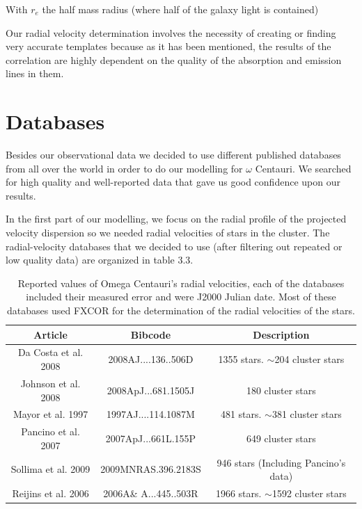 With $r_{e}$ the half mass radius (where half of the galaxy light is contained)

Our radial velocity determination involves the necessity of creating or finding very accurate templates because as it has been mentioned, the results of the correlation are highly dependent on the quality of the absorption and emission lines in them.   

\section{Databases}

Besides our observational data we decided to use different published databases from all over the world in order to do our modelling for $\omega$ Centauri. We searched for high quality and well-reported data that gave us good confidence upon our results.
 
In the first part of our modelling, we focus on the radial profile of the projected velocity dispersion so we needed radial velocities of stars in the cluster. The radial-velocity databases that we decided to use (after filtering out repeated or low quality data) are organized in table 3.3.

\begin{table}[H]
\begin{center}
\begin{tabular}{| c | c| c| }
    \hline
    \textbf{Article} & \textbf{Bibcode} & \textbf{Description} \\ \hline
     Da Costa et al. 2008 & 2008AJ....136..506D & 1355 stars. $\sim$204 cluster stars \\ \hline
     Johnson et al. 2008 & 2008ApJ...681.1505J & 180 cluster stars \\ \hline
     Mayor et al. 1997 & 1997AJ....114.1087M & 481 stars. $\sim$381 cluster stars \\ \hline
     Pancino et al. 2007& 2007ApJ...661L.155P & 649 cluster stars \\ \hline
     Sollima et al. 2009& 2009MNRAS.396.2183S & 946 stars (Including Pancino's data) \\ \hline
     Reijins et al. 2006 & 2006A\& A...445..503R & 1966 stars. $\sim$1592 cluster stars \\ \hline
     
  \end{tabular} 
\caption[Database]{Reported values of Omega Centauri's radial velocities, each of the databases included their measured error and were J2000 Julian date. Most of these databases used FXCOR for the determination of the radial velocities of the stars.}
\end{center}
\end{table}

